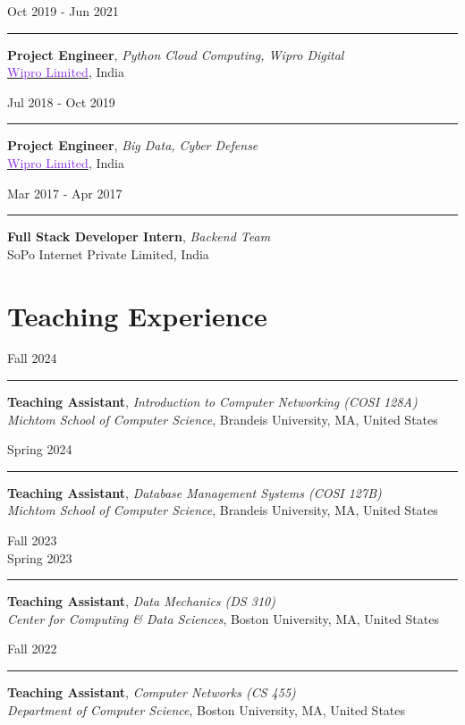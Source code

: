 \documentclass[10pt,a4paper,calibri]{moderncv}
\newcommand{\mediumspace}{\vspace{0.6em}}
\newcommand{\workexperience}[2]{
  \noindent
  \begin{minipage}[c]{0.20\textwidth}
    \begin{flushright}
      #1
    \end{flushright}
  \end{minipage}%
  \hspace{0.01\textwidth}
  \begin{minipage}[c]{0.02\textwidth}
    \textcolor{lightgray}{\rule{1pt}{0.7cm}}
  \end{minipage}%
  \begin{minipage}[c]{0.80\textwidth}
    \raggedright{
      #2
    }
  \end{minipage}%
}
\newcommand{\teachingexperience}[2]{
  \noindent
  \begin{minipage}[c]{0.12\textwidth}
    \begin{center}
      #1
    \end{center}
  \end{minipage}%
  \hspace{0.01\textwidth}
  \begin{minipage}[c]{0.02\textwidth}
    \textcolor{lightgray}{\rule{1pt}{0.7cm}}
  \end{minipage}%
  \begin{minipage}[c]{0.86\textwidth}
    \raggedright{
      \vspace{0.001cm}
      #2
      \vspace{0.001cm}
    }
  \end{minipage}%
}
\begin{document}
\workexperience{Oct 2019 \-- Jun 2021}{
	\textbf{Project Engineer}, \textit{Python Cloud Computing, Wipro Digital}\\
	\href{https://www.wipro.com/}{\textcolor{blueviolet}{Wipro Limited}}, India\\
}

\mediumspace

\workexperience{Jul 2018 \-- Oct 2019}{
	\textbf{Project Engineer}, \textit{Big Data, Cyber Defense}\\
	\href{https://www.wipro.com/}{\textcolor{blueviolet}{Wipro Limited}}, India\\
}

\mediumspace

\workexperience{Mar 2017 \-- Apr 2017}{
	\textbf{Full Stack Developer Intern}, \textit{Backend Team}\\
	SoPo Internet Private Limited, India\\
}


\section{Teaching Experience}
\teachingexperience{\hfill Fall 2024}{
	\textbf{Teaching Assistant}, \textit{Introduction to Computer Networking (COSI 128A)}\\
	\textit{Michtom School of Computer Science}, Brandeis University, MA, United States\\
}

\mediumspace

\teachingexperience{\hfill Spring 2024}{
	\textbf{Teaching Assistant}, \textit{Database Management Systems (COSI 127B)}\\
	\textit{Michtom School of Computer Science}, Brandeis University, MA, United States\\
}

\mediumspace

\teachingexperience{\hfill Fall 2023\\ \hfill Spring 2023}{
	\textbf{Teaching Assistant}, \textit{Data Mechanics (DS 310)}\\
	\textit{Center for Computing \& Data Sciences}, Boston University, MA, United States\\
}

\mediumspace

\teachingexperience{\hfill Fall 2022}{
	\textbf{Teaching Assistant}, \textit{Computer Networks (CS 455)}\\
	\textit{Department of Computer Science}, Boston University, MA, United States\\
}
\end{document}
